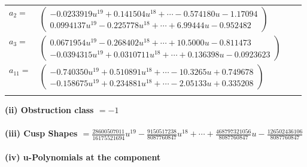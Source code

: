 \documentclass[1p]{elsarticle_modified}
\theoremstyle{definition}
\begin{document}
\begin{tabular}{m{7pt} m{180pt} m{7pt} m{180pt} }
\flushright $a_{2}=$&$\begin{pmatrix}-0.0233919 u^{19}+0.141504 u^{18}+\cdots-0.574180 u-1.17094\\0.0994137 u^{19}-0.225778 u^{18}+\cdots+6.99444 u-0.952482\end{pmatrix}$ \\
\flushright $a_{3}=$&$\begin{pmatrix}0.0671954 u^{19}-0.268402 u^{18}+\cdots+10.5000 u-0.811473\\-0.0394315 u^{19}+0.0310711 u^{18}+\cdots+0.136398 u-0.0923623\end{pmatrix}$ \\
\flushright $a_{11}=$&$\begin{pmatrix}-0.740350 u^{19}+0.510891 u^{18}+\cdots-10.3265 u+0.749678\\-0.158675 u^{19}+0.234881 u^{18}+\cdots-2.05133 u+0.335208\end{pmatrix}$\\&\end{tabular}
\flushleft \textbf{(ii) Obstruction class $= -1$}\\~\\
\flushleft \textbf{(iii) Cusp Shapes $= \frac{28600507011}{16175521694} u^{19}-\frac{9150517238}{8087760847} u^{18}+\cdots+\frac{468797321056}{8087760847} u-\frac{126502436106}{8087760847}$}\\~\\
\newpage\renewcommand{\arraystretch}{1}
\flushleft \textbf{(iv) u-Polynomials at the component}\newline \\
\end{document}
